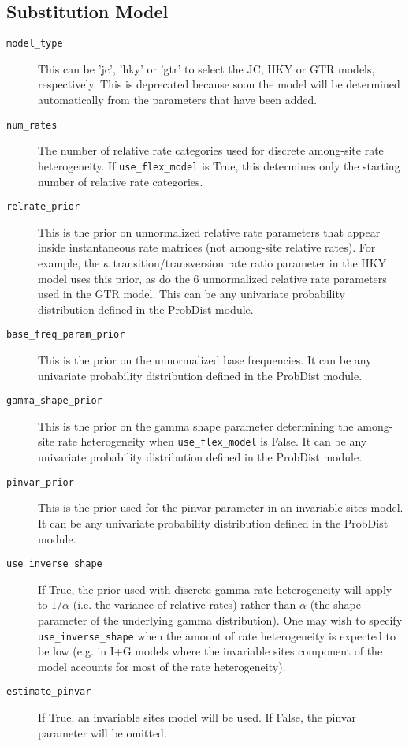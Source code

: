 \documentclass[10pt]{article}
\begin{document}
\subsection{Substitution Model}
\begin{description}
\item[{\tt model\_type}] This can be 'jc', 'hky' or 'gtr' to select the JC, HKY or GTR models, respectively. This is deprecated because soon the model will be determined automatically from the parameters that have been added.
\item[{\tt num\_rates}] The number of relative rate categories used for discrete among-site rate heterogeneity. If \verb+use_flex_model+ is True, this determines only the starting number of relative rate categories.
\item[{\tt relrate\_prior}] This is the prior on unnormalized relative rate parameters that appear inside instantaneous rate matrices (not among-site relative rates). For example, the $\kappa$ transition/transversion rate ratio parameter in the HKY model uses this prior, as do the 6 unnormalized relative rate parameters used in the GTR model. This can be any univariate probability distribution defined in the ProbDist module.
\item[{\tt base\_freq\_param\_prior}] This is the prior on the unnormalized base frequencies. It can be any univariate probability distribution defined in the ProbDist module.
\item[{\tt gamma\_shape\_prior}] This is the prior on the gamma shape parameter determining the among-site rate heterogeneity when \verb+use_flex_model+ is False. It can be any univariate probability distribution defined in the ProbDist module.
\item[{\tt pinvar\_prior}] This is the prior used for the pinvar parameter in an invariable sites model. It can be any univariate probability distribution defined in the ProbDist module.
\item[{\tt use\_inverse\_shape}] If True, the prior used with discrete gamma rate heterogeneity will apply to $1/\alpha$ (i.e. the variance of relative rates) rather than $\alpha$ (the shape parameter of the underlying gamma distribution). One may wish to specify \verb+use_inverse_shape+ when the amount of rate heterogeneity is expected to be low (e.g. in I+G models where the invariable sites component of the model accounts for most of the rate heterogeneity).
\item[{\tt estimate\_pinvar}] If True, an invariable sites model will be used. If False, the pinvar parameter will be omitted.
\end{description}
\end{document}
